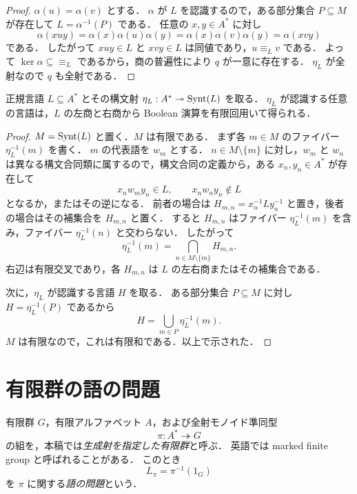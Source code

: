 \begin{proof}
$\alpha(u)=\alpha(v)$ とする．
$\alpha$ が $L$ を認識するので，ある部分集合 $P\subseteq M$ が存在して $L=\alpha^{-1}(P)$ である．
任意の $x,y\in A^*$ に対し
\[
\alpha(xuy)=\alpha(x)\alpha(u)\alpha(y)
             =\alpha(x)\alpha(v)\alpha(y)
             =\alpha(xvy)
\]
である．
したがって $xuy\in L$ と $xvy\in L$ は同値であり，$u\equiv_L v$ である．
よって $\ker\alpha\subseteq\equiv_L$ であるから，商の普遍性により $q$ が一意に存在する．
$\eta_L$ が全射なので $q$ も全射である．
\end{proof}

\begin{lemma}\label{lem:syntactic-fibers}
正規言語 $L\subseteq A^*$ とその構文射 $\eta_L:A^*\twoheadrightarrow\operatorname{Synt}(L)$ を取る．
$\eta_L$ が認識する任意の言語は，$L$ の左商と右商から Boolean 演算を有限回用いて得られる．
\end{lemma}

\begin{proof}
$M=\operatorname{Synt}(L)$ と置く．$M$ は有限である．
まず各 $m\in M$ のファイバー $\eta_L^{-1}(m)$ を書く．
$m$ の代表語を $w_m$ とする．
$n\in M\setminus\{m\}$ に対し，$w_m$ と $w_n$ は異なる構文合同類に属するので，構文合同の定義から，ある $x_n,y_n\in A^*$ が存在して
\[
x_nw_my_n\in L,
\qquad
x_nw_ny_n\notin L
\]
となるか，またはその逆になる．
前者の場合は $H_{m,n}=x_n^{-1}Ly_n^{-1}$ と置き，後者の場合はその補集合を $H_{m,n}$ と置く．
すると $H_{m,n}$ はファイバー $\eta_L^{-1}(m)$ を含み，ファイバー $\eta_L^{-1}(n)$ と交わらない．
したがって
\[
\eta_L^{-1}(m)=\bigcap_{n\in M\setminus\{m\}}H_{m,n}.
\]
右辺は有限交叉であり，各 $H_{m,n}$ は $L$ の左右商またはその補集合である．

次に，$\eta_L$ が認識する言語 $H$ を取る．
ある部分集合 $P\subseteq M$ に対し $H=\eta_L^{-1}(P)$ であるから
\[
H=\bigcup_{m\in P}\eta_L^{-1}(m).
\]
$M$ は有限なので，これは有限和である．以上で示された．
\end{proof}

\section{有限群の語の問題}

\begin{definition}
有限群 $G$，有限アルファベット $A$，および全射モノイド準同型
\[
\pi:A^*\twoheadrightarrow G
\]
の組を，本稿では\emph{生成射を指定した有限群}と呼ぶ．
英語では marked finite group と呼ばれることがある．
このとき
\[
L_\pi=\pi^{-1}(1_G)
\]
を $\pi$ に関する\emph{語の問題}という．
\end{definition}


